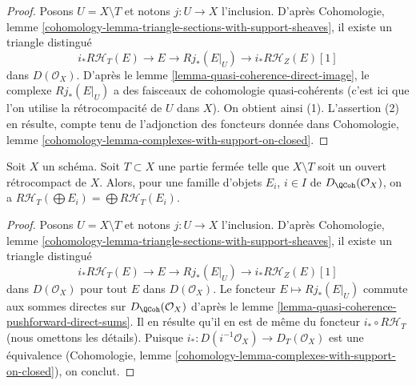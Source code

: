 \begin{proof}
Posons $U = X \setminus T$ et notons $j : U \to X$ l'inclusion. D'après
Cohomologie, lemme \ref{cohomology-lemma-triangle-sections-with-support-sheaves},
il existe un triangle distingué
$$
i_*R\mathcal{H}_T(E) \to E \to Rj_*(E|_U) \to i_*R\mathcal{H}_Z(E)[1]
$$
dans $D(\mathcal{O}_X)$. D'après le lemme \ref{lemma-quasi-coherence-direct-image},
le complexe $Rj_*(E|_U)$ a des faisceaux de cohomologie quasi-cohérents
(c'est ici que l'on utilise la rétrocompacité de $U$ dans $X$).
On obtient ainsi (1). L'assertion (2) en résulte, compte tenu de
l'adjonction des foncteurs donnée dans
Cohomologie, lemme \ref{cohomology-lemma-complexes-with-support-on-closed}.
\end{proof}

\begin{lemma}
\label{lemma-support-direct-sums}
Soit $X$ un schéma. Soit $T \subset X$ une partie fermée telle que
$X \setminus T$ soit un ouvert rétrocompact de $X$. Alors, pour une famille
d'objets $E_i$, $i \in I$ de $D_\QCoh(\mathcal{O}_X)$, on a
$R\mathcal{H}_T(\bigoplus E_i) = \bigoplus R\mathcal{H}_T(E_i)$.
\end{lemma}

\begin{proof}
Posons $U = X \setminus T$ et notons $j : U \to X$ l'inclusion. D'après
Cohomologie, lemme \ref{cohomology-lemma-triangle-sections-with-support-sheaves},
il existe un triangle distingué
$$
i_*R\mathcal{H}_T(E) \to E \to Rj_*(E|_U) \to i_*R\mathcal{H}_Z(E)[1]
$$
dans $D(\mathcal{O}_X)$ pour tout $E$ dans $D(\mathcal{O}_X)$. Le foncteur
$E \mapsto Rj_*(E|_U)$ commute aux sommes directes sur $D_\QCoh(\mathcal{O}_X)$
d'après le lemme \ref{lemma-quasi-coherence-pushforward-direct-sums}.
Il en résulte qu'il en est de même du foncteur $i_* \circ R\mathcal{H}_T$
(nous omettons les détails). Puisque $i_* : D(i^{-1}\mathcal{O}_X) \to D_T(\mathcal{O}_X)$
est une équivalence
(Cohomologie, lemme \ref{cohomology-lemma-complexes-with-support-on-closed}),
on conclut.
\end{proof}

